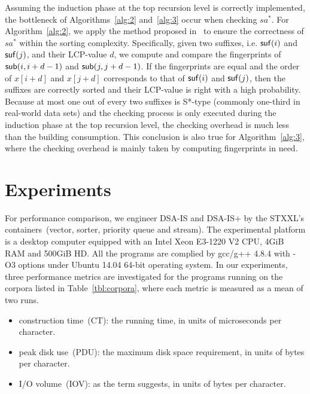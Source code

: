 \documentclass[10pt,journal,compsoc]{IEEEtran}
\begin{document}
Assuming the induction phase at the top recursion level is correctly implemented, the bottleneck of Algorithms~\ref{alg:2} and~\ref{alg:3} occur when checking $sa^*$. For Algorithm~\ref{alg:2}, we apply the method proposed in~\cite{wu2017} to ensure the correctness of $sa^*$ within the sorting complexity. Specifically, given two suffixes, i.e. ${\sf suf}(i)$ and ${\sf suf}(j)$, and their LCP-value $d$, we compute and compare the fingerprints of ${\sf sub}(i, i + d - 1)$ and ${\sf sub}(j, j + d - 1)$. If the fingerprints are equal and the order of $x[i + d]$ and $x[j + d]$ corresponds to that of ${\sf suf}(i)$ and ${\sf suf}(j)$, then the suffixes are correctly sorted and their LCP-value is right with a high probability. Because at most one out of every two suffixes is S*-type (commonly one-third in real-world data sets) and the checking process is only executed during the induction phase at the top recursion level, the checking overhead is much less than the building consumption. This conclusion is also true for Algorithm~\ref{alg:3}, where the checking overhead is mainly taken by computing fingerprints in need.
 
\section{Experiments} \label{sec:experiments}

For performance comparison, we engineer DSA-IS and DSA-IS+ by the STXXL's containers~(vector, sorter, priority queue and stream). The experimental platform is a desktop computer equipped with an Intel Xeon E3-1220 V2 CPU, 4GiB RAM and 500GiB HD. All the programs are complied by gcc/g++ 4.8.4 with -O3 options under Ubuntu 14.04 64-bit operating system. In our experiments, three performance metrics are investigated for the programs running on the corpora listed in Table~\ref{tbl:corpora}, where each metric is measured as a mean of two runs.

\begin{itemize}
	\item construction time~(CT): the running time, in units of microseconds per character.
	\item peak disk use~(PDU): the maximum disk space requirement, in units of bytes per character.
	\item I/O volume~(IOV): as the term suggests, in units of bytes per character.
\end{itemize}
\end{document}
